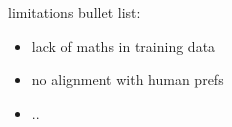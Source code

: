 limitations bullet list:
\begin{itemize}
    \item lack of maths in training data
    \item no alignment with human prefs
    \item ..
\end{itemize}